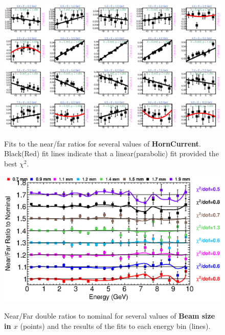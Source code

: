 {\begin{figure}[ht]
  \begin{center}
    {\includegraphics[width=5.0in]{figures/HornCurrent_nof_fits.eps}}
  \end{center}
\caption{ Fits to the near/far ratios for several values of {\bf HornCurrent}. Black(Red) fit lines indicate that a linear(parabolic) fit provided the best $\chi^2$. }
\end{figure}

\begin{figure}[ht]
  \begin{center}
    {\includegraphics[width=6.0in]{figures/BeamSigmaX_nof_summary.eps}}
  \end{center}
\caption{ Near/Far double ratios to nominal for several values of {\bf Beam size in $x$} (points) and the results of the fits to each energy bin (lines).}
\end{figure}

}

